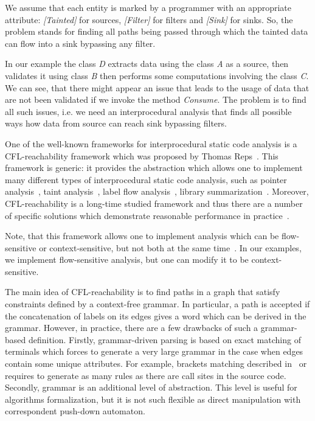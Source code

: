 We assume that each entity is marked by a programmer with an appropriate attribute: \textit{[Tainted]} for sources, \textit{[Filter]} for filters and \textit{[Sink]} for sinks.
So, the problem stands for finding all paths being passed through which the tainted data can flow into a sink bypassing any filter.

In our example the class \textit{D} extracts data using the class \textit{A} as a source, then validates it using class \textit{B} then performs some computations involving the class \textit{C}.
We can see, that there might appear an issue that leads to the usage of data that are not been validated if we invoke the method \textit{Consume}.
The problem is to find all such issues, i.e. we need an interprocedural analysis that finds all possible ways how data from source can reach sink bypassing filters.

One of the well-known frameworks for interprocedural static code analysis is a CFL-reachability framework which was proposed by Thomas Reps~\cite{Reps}.
This framework is generic: it provides the abstraction which allows one to implement many different types of interprocedural static code analysis, such as pointer analysis~\cite{Zheng, JavaCFL}, taint analysis~\cite{Huang:2015:SPT:2771783.2771803}, label flow analysis~\cite{10.1007/11823230_7,CFLr}, library summarization~\cite{10.1007/978-3-662-54434-1_33}.
Moreover, CFL-reachability is a long-time studied framework and thus there are a number of specific solutions which demonstrate reasonable performance in practice~\cite{Wang:2017:GSD:3093315.3037744}.

Note, that this framework allows one to implement analysis which can be flow-sensitive or context-sensitive, but not both at the same time~\cite{Reps:2000:UCD:345099.345137}. In our examples, we implement flow-sensitive analysis, but one can modify it to be context-sensitive.

The main idea of CFL-reachability is to find paths in a graph that satisfy constraints defined by a context-free grammar.
In particular, a path is accepted if the concatenation of labels on its edges gives a word which can be derived in the grammar.
However, in practice, there are a few drawbacks of such a grammar-based definition.
Firstly, grammar-driven parsing is based on exact matching of terminals which forces to generate a very large grammar in the case when edges contain some unique attributes.
For example, brackets matching described in~\cite{CFLr} or~\cite{Zheng, JavaCFL} requires to generate as many rules as there are call sites in the source code.
Secondly, grammar is an additional level of abstraction.
This level is useful for algorithms formalization, but it is not such flexible as direct manipulation with correspondent push-down automaton.

